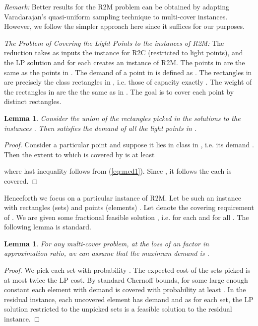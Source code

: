 \documentclass[11pt]{article}
\newtheorem{lemma}[thm]{Lemma}
\begin{document}
\noindent
{\em Remark:} Better results for the R2M problem can be obtained by adapting Varadarajan's quasi-uniform
sampling technique to multi-cover instances. However, we follow the simpler approach here since it suffices for our purposes.

\medskip

{\em The Problem of 
Covering the Light Points to the instances  of R2M:} 
The reduction takes as inputs 
the instance  for R2C (restricted to light points), and the LP solution  
and for each  creates an instance  of R2M.
The points in  are the same as the points in .
The demand of a point  in  is defined as 
.
The rectangles in  are precisely the class  rectangles in , i.e. those of capacity  exactly .
The weight of the rectangles in  are the the same as in .
The goal is to cover each point  by  distinct rectangles. 



\begin{lemma}
Consider the union  of the rectangles picked in the solutions 
to the instances .
Then  satisfies the demand of  all the light points in .
\end{lemma}
\begin{proof} 
Consider a particular point  and suppose it lies in class  in , i.e. its demand . Then the extent to which  is
covered by  is at least
{\allowdisplaybreaks

}
where last inequality follows from (\ref{eq:med1}).
Since , it follows the each  is covered.
\end{proof} 

Henceforth we focus on a particular instance of R2M.
Let  be such an instance with  rectangles (sets)  and  points (elements) . Let  denote the covering requirement of . 
We are given  some fractional feasible solution , i.e. for each    and  for all .
The following lemma is standard.
\begin{lemma}
\label{lowdem}
For any multi-cover problem, 
at the loss of an  factor in approximation ratio, we can assume that the maximum demand  is . 
\end{lemma}
\begin{proof}
We pick each set  with probability . The expected cost of the sets picked is at most twice the LP cost.
By standard Chernoff bounds, for some large enough constant 
each element with demand  is covered 
with probability at least . In the residual instance, each uncovered element has demand  
and as  for each set, the LP solution restricted to the unpicked sets is a feasible solution to the residual instance.
\end{proof}
\end{document}
